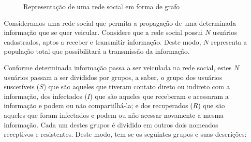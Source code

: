 \documentclass[
	12pt,				%
	openright,			%
	oneside,			%
	a4paper,			%
	english,			%
	french,				%
	spanish,			%
	brazil				%
	]{abntex2}
\begin{document}
\begin{center}
    \begin{figure}
      \begin{center}
        \setlength\fboxsep{0pt}
        \setlength\fboxrule{0pt}
        \caption{Representação de uma rede social em forma de grafo}
        \label{fig:grafo}
      \end{center}
    \end{figure}
\end{center}

Consideramos uma rede social que permita a propagação de uma
determinada informação que se quer veicular. Considere que a rede
social possui $N$ usuários cadastrados, aptos a receber e transmitir
informação. Deste modo, $N$ representa a população total que
possibilitará a transmissão da informação.

Conforme determinada informação passa a ser veiculada na rede social,
estes $N$ usuários passam a ser divididos por grupos, a saber, o grupo
dos usuários suscetíveis ($S$) que são aqueles que tiveram contato
direto ou indireto com a informação, dos infectados ($I$) que são
aqueles que receberam e acessaram a informação e podem ou não
compartilhá-la; e dos recuperados ($R$) que são aqueles que foram
infectados e podem ou não acessar novamente a mesma informação. Cada
um destes grupos é dividido em outros dois nomeados receptivos e
resistentes. Deste modo, tem-se os seguintes grupos e suas descrições:
\end{document}
